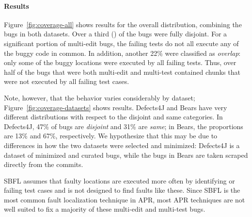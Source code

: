 \paragraph{Results}
Figure~\ref{fig:coverage-all} shows results for the overall distribution,
combining the bugs in both datasets. Over a third ()
of the bugs were fully disjoint.  For a significant portion of multi-edit bugs,
the failing tests do not all execute any of the buggy code in common.  
In addition, another 22\% were classified as \emph{overlap}: only some of the
buggy locations were executed by all failing tests. Thus, over half of 
the bugs that were both multi-edit and multi-test contained chunks that were 
not executed by all failing test cases.


Note, however, that the behavior varies considerably by dataset;
Figure~\ref{fig:coverage-datasets} shows results.  Defects4J and 
Bears have very different distributions with respect to the 
disjoint and same categories. In Defects4J, 47\% of bugs are \emph{disjoint} and 
31\% are \emph{same}; in Bears, the proportions are 13\% and 67\%, respectively.
We hypothesize that this may be due to differences in how the two  
datasets were selected and minimized: Defects4J is a dataset of minimized and curated 
bugs, while the bugs in Bears are taken scraped directly from the
commits.  

SBFL assumes that faulty locations are executed more often by identifying 
or failing test cases and is not designed to find faults like these. Since SBFL 
is the most common fault localization technique in APR, most APR techniques 
are not well suited to fix a majority of these multi-edit and multi-test 
bugs.



%

